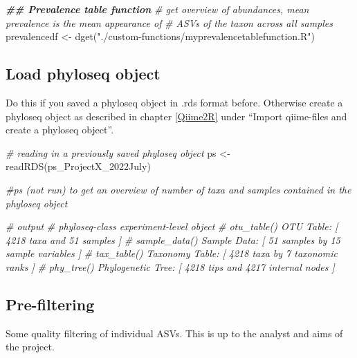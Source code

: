 \documentclass[
]{book}
\newenvironment{Shaded}{\begin{snugshade}}{\end{snugshade}}
\newcommand{\CommentTok}[1]{\textcolor[rgb]{0.56,0.35,0.01}{\textit{#1}}}
\newcommand{\DocumentationTok}[1]{\textcolor[rgb]{0.56,0.35,0.01}{\textbf{\textit{#1}}}}
\newcommand{\FunctionTok}[1]{\textcolor[rgb]{0.00,0.00,0.00}{#1}}
\newcommand{\NormalTok}[1]{#1}
\newcommand{\OtherTok}[1]{\textcolor[rgb]{0.56,0.35,0.01}{#1}}
\newcommand{\StringTok}[1]{\textcolor[rgb]{0.31,0.60,0.02}{#1}}
\begin{document}
\begin{Shaded}
\begin{Highlighting}[]
\DocumentationTok{\#\# Prevalence table function}
\CommentTok{\# get overview of abundances, mean prevalence is the mean \textquotesingle{}appearance\textquotesingle{} of }
\CommentTok{\# ASVs of the taxon across all samples}
\NormalTok{prevalencedf }\OtherTok{\textless{}{-}} \FunctionTok{dget}\NormalTok{(}\StringTok{"./custom{-}functions/myprevalencetablefunction.R"}\NormalTok{)}
\end{Highlighting}
\end{Shaded}

\hypertarget{load-phyloseq-object-2}{%
\subsection{Load phyloseq object}\label{load-phyloseq-object-2}}

Do this if you saved a phyloseq object in .rds format before. Otherwise create a phyloseq object as described in chapter \ref{Qiime2R} under ``Import qiime-files and create a phyloseq object''.

\begin{Shaded}
\begin{Highlighting}[]
\CommentTok{\# reading in a previously saved phyloseq object}
\NormalTok{ps }\OtherTok{\textless{}{-}} \FunctionTok{readRDS}\NormalTok{(}\StringTok{\textquotesingle{}ps\_ProjectX\_2022July\textquotesingle{}}\NormalTok{)}

\CommentTok{\#ps (not run) to get an overview of number of taxa and samples contained in the phyloseq object}

\CommentTok{\# output}
\CommentTok{\# phyloseq{-}class experiment{-}level object}
\CommentTok{\# otu\_table()   OTU Table:         [ 4218 taxa and 51 samples ]}
\CommentTok{\# sample\_data() Sample Data:       [ 51 samples by 15 sample variables ]}
\CommentTok{\# tax\_table()   Taxonomy Table:    [ 4218 taxa by 7 taxonomic ranks ]}
\CommentTok{\# phy\_tree()    Phylogenetic Tree: [ 4218 tips and 4217 internal nodes ]}
\end{Highlighting}
\end{Shaded}

\hypertarget{pre-filtering-1}{%
\subsection{Pre-filtering}\label{pre-filtering-1}}

Some quality filtering of individual ASVs. This is up to the analyst and aims of the project.
\end{document}
